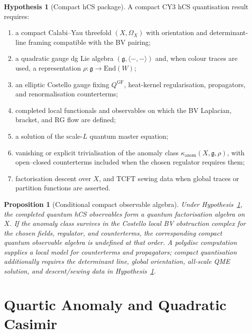 \documentclass[11pt]{amsart}
\newtheorem{proposition}[theorem]{Proposition}
\theoremstyle{definition}
\newtheorem{hypothesis}[theorem]{Hypothesis}
\theoremstyle{remark}
\providecommand{\End}{\mathrm{End}}
\providecommand{\fg}{\mathfrak{g}}
\providecommand{\kanom}{\kappa_{\mathrm{anom}}}
\begin{document}
\begin{hypothesis}[Compact hCS package]
\label{hyp:compact-hcs-package}
A compact CY3 hCS quantisation result requires:
\begin{enumerate}[label=\textup{(\roman*)}]
\item a compact Calabi--Yau threefold $(X,\Omega_X)$ with orientation and
determinant-line framing compatible with the BV pairing;
\item a quadratic gauge dg Lie algebra $(\fg,\langle-,-\rangle)$ and,
when colour traces are used, a representation
$\rho\colon\fg\to\End(W)$;
\item an elliptic Costello gauge fixing $Q^{\mathrm{GF}}$, heat-kernel
regularisation, propagators, and renormalisation counterterms;
\item completed local functionals and observables on which the BV
Laplacian, bracket, and RG flow are defined;
\item a solution of the scale-$L$ quantum master equation;
\item vanishing or explicit trivialisation of the anomaly class
$\kanom(X,\fg,\rho)$, with open--closed counterterms included when the
chosen regulator requires them;
\item factorisation descent over $X$, and TCFT sewing data when global
traces or partition functions are asserted.
\end{enumerate}
\end{hypothesis}

\begin{proposition}[Conditional compact observable algebra]
\label{prop:compact-conditional}
Under Hypothesis~\ref{hyp:compact-hcs-package}, the completed quantum
hCS observables form a quantum factorisation algebra on $X$.  If the
anomaly class survives in the Costello local BV obstruction complex for
the chosen fields, regulator, and counterterms, the corresponding compact
quantum observable algebra is undefined at that order.
A polydisc computation supplies a local model for counterterms and
propagators; compact quantisation additionally requires the determinant
line, global orientation, all-scale QME solution, and descent/sewing
data in Hypothesis~\ref{hyp:compact-hcs-package}.
\end{proposition}

\section{Quartic Anomaly and Quadratic Casimir}
\end{document}
